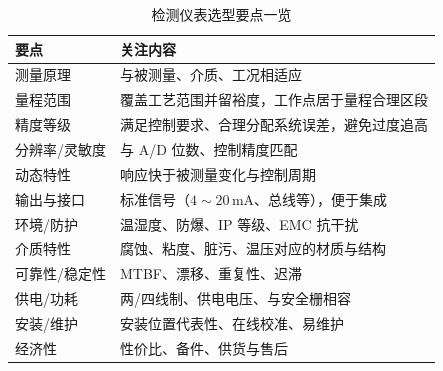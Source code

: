 \documentclass[12pt,a4paper]{ctexart}
\begin{document}
\begin{table}[htbp]
  \centering
  \caption{检测仪表选型要点一览}
  \renewcommand{\arraystretch}{1.25}
  \begin{tabular}{>{\raggedright\arraybackslash}p{3.2cm} >{\raggedright\arraybackslash}p{9.2cm}}
    \toprule
    \textbf{要点} & \textbf{关注内容} \\
    \midrule
    测量原理     & 与被测量、介质、工况相适应 \\
    量程范围     & 覆盖工艺范围并留裕度，工作点居于量程合理区段 \\
    精度等级     & 满足控制要求、合理分配系统误差，避免过度追高 \\
    分辨率/灵敏度 & 与 A/D 位数、控制精度匹配 \\
    动态特性     & 响应快于被测量变化与控制周期 \\
    输出与接口   & 标准信号（$4\sim20\,\mathrm{mA}$、总线等），便于集成 \\
    环境/防护    & 温湿度、防爆、IP 等级、EMC 抗干扰 \\
    介质特性     & 腐蚀、粘度、脏污、温压对应的材质与结构 \\
    可靠性/稳定性 & MTBF、漂移、重复性、迟滞 \\
    供电/功耗    & 两/四线制、供电电压、与安全栅相容 \\
    安装/维护    & 安装位置代表性、在线校准、易维护 \\
    经济性       & 性价比、备件、供货与售后 \\
    \bottomrule
  \end{tabular}
\end{table}
 
\end{document}
